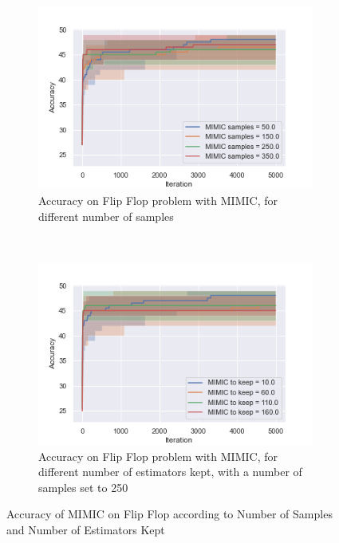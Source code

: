 \documentclass[twocolumn, 10pt]{article}
\begin{document}
				\begin{figure}[h]
					\centering
					\begin{subfigure}[t]{0.45\columnwidth}
						\centering
						\includegraphics[width=\linewidth]{../graphics/flip_flop_MIMIC_Iteration_Error_MIMIC_samples.png}
						\caption{Accuracy on Flip Flop problem with MIMIC, for different number of samples}
						\label{ff:mimic_samples}
					\end{subfigure}
					~
					\begin{subfigure}[t]{0.45\columnwidth}
						\centering
						\includegraphics[width=\linewidth]{../graphics/flip_flop_MIMIC_Iteration_Error_MIMIC_to_keep.png}
						\caption{Accuracy on Flip Flop problem with MIMIC, for different number of estimators kept, with a number of samples set to 250}
						\label{ff:mimic_to_keep}
					\end{subfigure}
					\caption{Accuracy of MIMIC on Flip Flop according to Number of Samples and Number of Estimators Kept}
					\label{ff:mimic}
				\end{figure}
\end{document}
